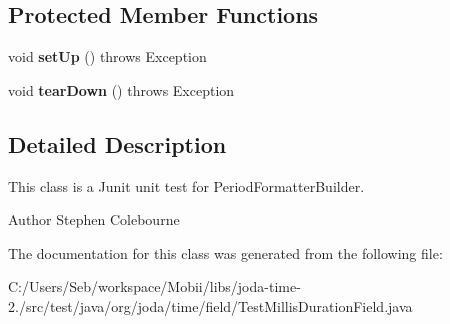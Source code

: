 \subsection*{Protected Member Functions}
\begin{DoxyCompactItemize}
\item 
\hypertarget{classorg_1_1joda_1_1time_1_1field_1_1_test_millis_duration_field_a787847602d88babd7e070bf62fc07f84}{void {\bfseries set\-Up} ()  throws Exception }\label{classorg_1_1joda_1_1time_1_1field_1_1_test_millis_duration_field_a787847602d88babd7e070bf62fc07f84}

\item 
\hypertarget{classorg_1_1joda_1_1time_1_1field_1_1_test_millis_duration_field_ad4f375f845331671dba07d9715184bc6}{void {\bfseries tear\-Down} ()  throws Exception }\label{classorg_1_1joda_1_1time_1_1field_1_1_test_millis_duration_field_ad4f375f845331671dba07d9715184bc6}

\end{DoxyCompactItemize}


\subsection{Detailed Description}
This class is a Junit unit test for Period\-Formatter\-Builder.

\begin{DoxyAuthor}{Author}
Stephen Colebourne 
\end{DoxyAuthor}


The documentation for this class was generated from the following file\-:\begin{DoxyCompactItemize}
\item 
C\-:/\-Users/\-Seb/workspace/\-Mobii/libs/joda-\/time-\/2./src/test/java/org/joda/time/field/Test\-Millis\-Duration\-Field.\-java\end{DoxyCompactItemize}
